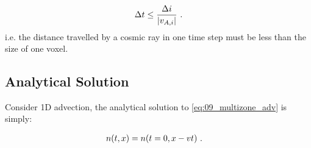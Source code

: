 \begin{equation}
    \begin{aligned}
    \Delta t \leq \frac{\Delta i}{\abs{v_{A,i}}}\text{ .} 
    \end{aligned} \label{eq:09_multizone_advection_stability}
\end{equation}
\noindent i.e. the distance travelled by a cosmic ray in one time step must be less than the size of one voxel.

\subsection{Analytical Solution} \label{sec:09_multizone_adv}

Consider 1D advection, the analytical solution to \autoref{eq:09_multizone_adv} is simply:

\begin{equation}
    \begin{aligned}
        n\qty(t,x)&=n\qty(t=0,x-vt)\text{ .} 
    \end{aligned}
\end{equation}


